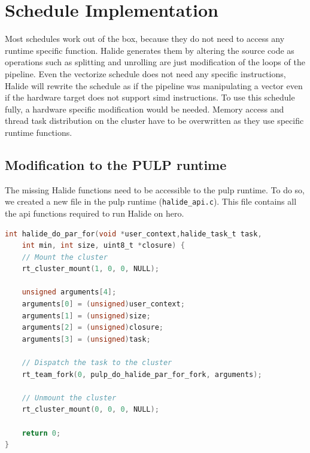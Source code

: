 \section{Schedule Implementation }
    Most schedules work out of the box, because they do not need to access any runtime specific function.
    Halide generates them by altering the source code as operations such as splitting and unrolling are just modification of the loops of the pipeline. 
    Even the vectorize schedule does not need any specific instructions, Halide will rewrite the schedule as if the pipeline was manipulating a vector even if the hardware target does not support \gls{simd} instructions.
     To use this schedule fully,  a hardware specific modification would be needed.
    Memory access and thread task distribution on the cluster have to be overwritten as they use specific runtime functions.

    \subsection{Modification to the PULP runtime}

    The missing Halide functions need to be accessible to the \gls{pulp} runtime. To do so, we created a new file in the \gls{pulp} runtime (\texttt{halide\_api.c}). 
    This file contains all the \gls{api} functions required to run Halide on \gls{hero}.

\begin{lstlisting}[language=C,caption={The \texttt{halide\_do\_par\_for} function.},label={lst:halidedoparfor},captionpos=b]
int halide_do_par_for(void *user_context,halide_task_t task,
    int min, int size, uint8_t *closure) {
    // Mount the cluster
    rt_cluster_mount(1, 0, 0, NULL);

    unsigned arguments[4];
    arguments[0] = (unsigned)user_context;
    arguments[1] = (unsigned)size;
    arguments[2] = (unsigned)closure;
    arguments[3] = (unsigned)task;

    // Dispatch the task to the cluster
    rt_team_fork(0, pulp_do_halide_par_for_fork, arguments);

    // Unmount the cluster
    rt_cluster_mount(0, 0, 0, NULL);

    return 0;
}
\end{lstlisting}


